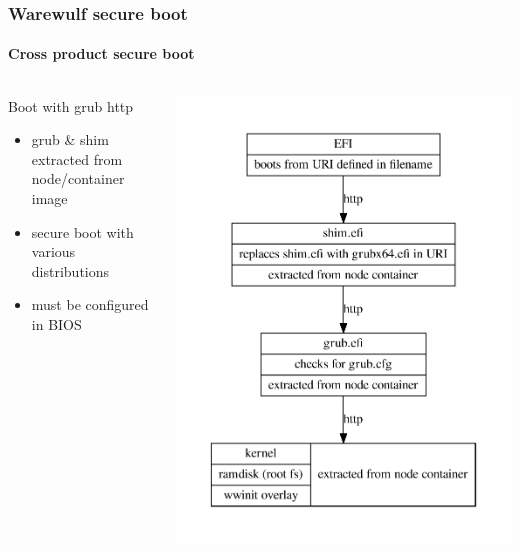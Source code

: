 \documentclass[aspectratio=169]{beamer}
\begin{document}
\begin{frame}[fragile]
\frametitle{Warewulf secure boot}
\framesubtitle{Cross product secure boot }
\begin{columns}
\begin{block}{Boot with grub http}
\begin{itemize}
  \item grub \& shim extracted from node/container image
  \item secure boot with various distributions
  \item must be configured in BIOS
\end{itemize}
\end{block}
\includegraphics[width=.8\linewidth]{grub_http}
\end{columns}
\end{frame}
\end{document}
